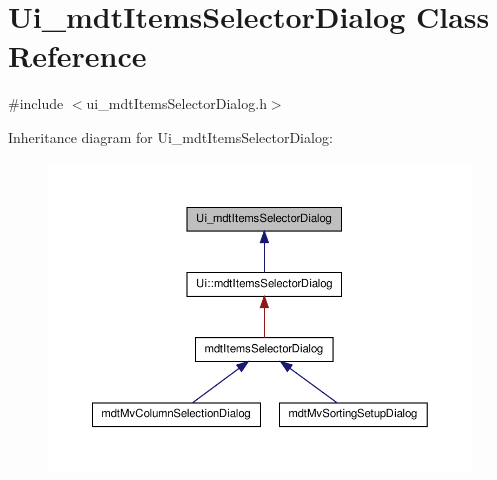 \hypertarget{class_ui__mdt_items_selector_dialog}{\section{Ui\-\_\-mdt\-Items\-Selector\-Dialog Class Reference}
\label{class_ui__mdt_items_selector_dialog}
}


{\ttfamily \#include $<$ui\-\_\-mdt\-Items\-Selector\-Dialog.\-h$>$}



Inheritance diagram for Ui\-\_\-mdt\-Items\-Selector\-Dialog\-:
\nopagebreak
\begin{figure}[H]
\begin{center}
\leavevmode
\includegraphics[width=350pt]{class_ui__mdt_items_selector_dialog__inherit__graph}
\end{center}
\end{figure}


